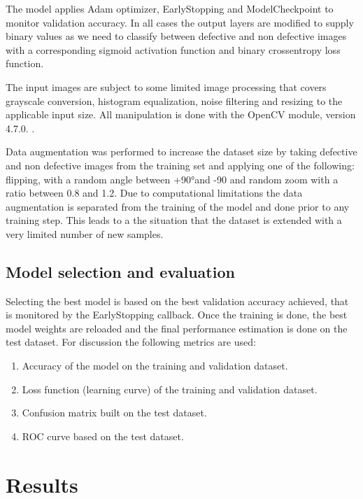 \documentclass[10pt, final]{article}
\begin{document}
The model applies Adam optimizer, EarlyStopping and ModelCheckpoint to monitor validation accuracy.
In all cases the output layers are modified to supply binary values as we need to classify between defective and
non defective images with a corresponding sigmoid activation function and binary crossentropy loss function.

The input images are subject to some limited image processing that covers grayscale conversion, histogram equalization,
noise filtering and resizing to the applicable input size.
All manipulation is done with the OpenCV module, version 4.7.0. \cite{_home_}.

Data augmentation was performed to increase the dataset size by taking defective and non defective images
from the training set and applying one of the following: flipping, with a random angle between +90°and -90 and
random zoom with a ratio between 0.8 and 1.2.
Due to computational limitations the data augmentation is separated from the training of the model and done prior
to any training step.
This leads to a the situation that the dataset is extended with a very limited number of new samples.

\subsection{Model selection and evaluation}
Selecting the best model is based on the best validation accuracy achieved, that is monitored by the EarlyStopping
callback.
Once the training is done, the best model weights are reloaded and the final performance estimation is done
on the test dataset.
For discussion the following metrics are used:

\begin{enumerate}
	\item Accuracy of the model on the training and validation dataset.
	\item Loss function (learning curve) of the training and validation dataset.
	\item Confusion matrix built on the test dataset.
	\item ROC curve based on the test dataset.
\end{enumerate}

\section{Results} \label{sec:results}
\end{document}
